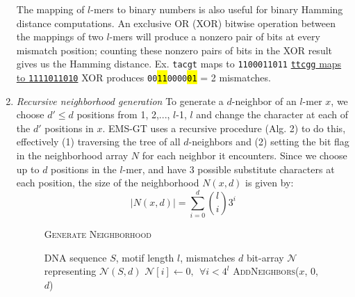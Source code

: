 \documentclass[conference]{IEEEtran}
\begin{document}
\begin{enumerate}[label={\em \arabic*.}]
			The mapping of $l$-mers to binary numbers  is also useful for binary Hamming distance computations. An exclusive OR (XOR) bitwise operation between the mappings of two $l$-mers will produce a nonzero pair of bits at every mismatch position; counting these nonzero pairs of bits in the XOR result gives us the Hamming distance.\newline \newline
			{\small Ex.	\texttt{tacgt} maps to \texttt{1100011011} \newline
				\vspace*{2pt}\hspace*{12pt} \underline{\texttt{ttcgg} maps to \texttt{1111011010}} \newline
				\hspace*{17pt}	XOR produces \texttt{00\hl{11}0000\hl{01}} = 2 mismatches.}
			\bigskip
		\item{\em Recursive neighborhood generation}\newline
			To generate a $d$-neighbor of an $l$-mer $x$, we choose $d' \leq d$ positions from 1, 2,..., $l$-1, $l$ and change the character at each of the $d'$ positions in $x$. EMS-GT uses a recursive procedure (Alg. 2) to do this, effectively (1) traversing the tree of all $d$-neighbors and (2) setting the bit flag in the neighborhood array $N$ for each neighbor it encounters. Since we choose up to $d$ positions in the $l$-mer, and have 3 possible substitute characters at each position, the size of the neighborhood $N(x,d)$ is given by: %
			\begin{equation}
				|N(x,d)| = \sum_{i=0}^d \binom{l}{i} 3^{i}
			\end{equation}
			\vspace{-5mm}
			\begin{figure}[b]
			\noindent \hspace*{6pt}{\bf Algorithm 2} \textsc{Generate Neighborhood}
			\begin{algorithmic}[1]
				\label{alg:recursive-nbr-gen}
				\Require DNA sequence $S$, motif length $l$, mismatches $d$
				\Ensure bit-array $\mathcal{N}$ representing $\mathcal{N}(S,d)$ \vspace*{6pt}
				\State $\mathcal{N}[i] \leftarrow 0,\ \ \forall i < 4^{l}$ 
				\State \textsc{AddNeighbors}($x$, 0, $d$) \hspace*{9pt}
				\EndFor
				\State {}

\end{algorithmic}
\end{figure}
\end{enumerate}
\end{document}
